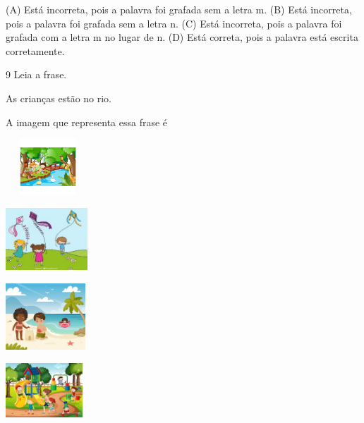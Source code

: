 (A) Está incorreta, pois a palavra foi grafada sem a letra m.
(B) Está incorreta, pois a palavra foi grafada sem a letra n.
(C) Está incorreta, pois a palavra foi grafada com a letra m no lugar de n.
(D) Está correta, pois a palavra está escrita corretamente.

\num{9} Leia a frase.

As crianças estão no rio.

A imagem que representa essa frase é

\begin{escolha}
\item \includegraphics[width=1.25000in,height=0.82361in]{media/image154.jpeg}

\item \includegraphics[width=1.21181in,height=0.92014in]{media/image155.jpeg}

\item \includegraphics[width=1.18125in,height=0.98472in]{media/image156.jpeg}

\item \includegraphics[width=1.13611in,height=0.80208in]{media/image157.jpeg}
\end{escolha}


